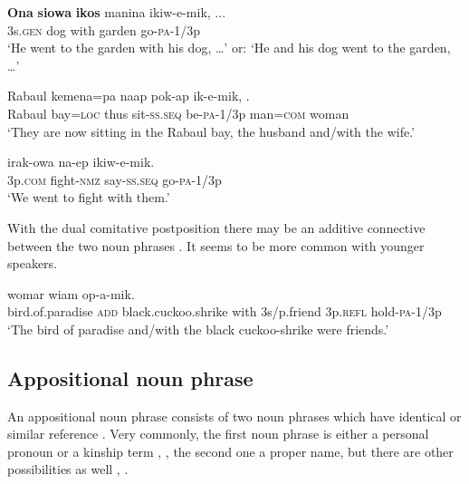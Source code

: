\ea%
\label{ex:4:x819}
\gll \textbf{Ona} \textbf{siowa} \textbf{ikos}  manina  ikiw-e-mik, ... \\
  3s.\textsc{gen}  dog  with  garden  go-\textsc{pa}-1/3p    \\
\glt`He went to the garden with his dog, {\dots}' or: `He and his dog went to the garden, {\dots}'
\z

\ea%
\label{ex:4:x832}
\gll Rabaul  kemena=pa  naap  pok-ap  ik-e-mik,   . \\
    Rabaul  bay=\textsc{loc}  thus  sit-\textsc{ss}.\textsc{seq}  be-\textsc{pa}-1/3p  man=\textsc{com}  woman  \\
\glt`They are now sitting in the Rabaul bay, the husband and/with the wife.'
\z

\ea%
\label{ex:4:x831}
\gll {}  irak-owa  na-ep  ikiw-e-mik. \\
  3p.\textsc{com}  fight-\textsc{nmz}  say-\textsc{ss}.\textsc{seq}  go-\textsc{pa}-1/3p    \\
\glt`We went to fight with them.'
\z

With the dual comitative postposition   there may be an additive connective  between the two noun phrases . It seems to be more common with younger speakers. 

\ea%
\label{ex:4:x820}
\gll {}     womar wiam  op-a-mik. \\
   bird.of.paradise  \textsc{add}  black.cuckoo.shrike  with  3s/p.friend  3p.\textsc{refl}  hold-\textsc{pa}-1/3p   \\
\glt`The bird of paradise and/with the black cuckoo-shrike were friends.'
\z

\subsection{Appositional noun phrase} \label{sec:4.1.4}
{}
An appositional noun phrase consists of two noun phrases which have identical or similar reference \citep[24]{Crystal1997}.  Very commonly, the first noun phrase is either a personal pronoun  or a kinship term , , the second one a proper name, but there are other possibilities as well , .  


